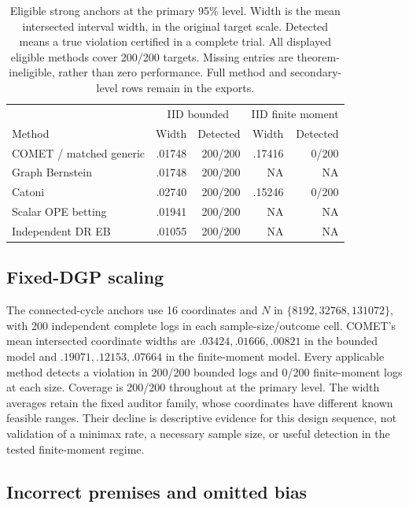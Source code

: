 \begin{table}[tbp]
\centering
\small
\begin{tabular}{lrrrr}
\toprule
 & \multicolumn{2}{c}{IID bounded} & \multicolumn{2}{c}{IID finite moment}\\
Method & Width & Detected & Width & Detected\\
\midrule
COMET / matched generic & .01748 & 200/200 & .17416 & 0/200\\
Graph Bernstein & .01748 & 200/200 & NA & NA\\
Catoni & .02740 & 200/200 & .15246 & 0/200\\
Scalar OPE betting & .01941 & 200/200 & NA & NA\\
Independent DR EB & .01055 & 200/200 & NA & NA\\
\bottomrule
\end{tabular}
\caption{Eligible strong anchors at the primary 95\% level. Width is the mean
intersected interval width, in the original target scale. Detected means a true
violation certified in a complete trial. All displayed eligible methods cover
200/200 targets. Missing entries are theorem-ineligible, rather than zero
performance. Full method and secondary-level rows remain in the exports.}
\label{tab:post-iid}
\end{table}

\subsection{Fixed-DGP scaling}

The connected-cycle anchors use 16 coordinates and $N$ in
$\{8192,32768,131072\}$, with 200 independent complete logs in each
sample-size/outcome cell. COMET's mean intersected coordinate widths are
$.03424,.01666,.00821$ in the bounded model and
$.19071,.12153,.07664$ in the finite-moment model. Every applicable method
detects a violation in 200/200 bounded logs and 0/200 finite-moment logs at
each size. Coverage is 200/200 throughout at the primary level.
The width averages retain the fixed auditor family, whose coordinates have
different known feasible ranges. Their decline is descriptive evidence for
this design sequence, not validation of a minimax rate, a necessary sample
size, or useful detection in the tested finite-moment regime.

\subsection{Incorrect premises and omitted bias}

